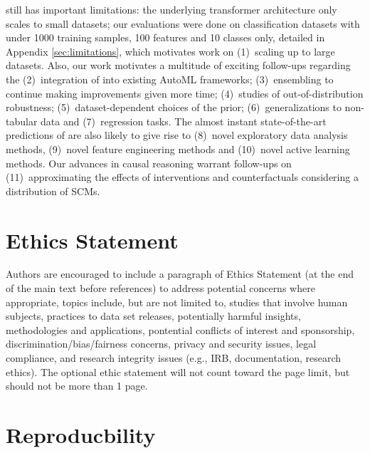 \documentclass{article}
\begin{document}
\methodname{} still has important limitations: the underlying transformer architecture only scales to small datasets; our evaluations were done on classification datasets with under 1000 training samples, 100 features and 10 classes only, detailed in Appendix \ref{sec:limitations}, which motivates work on (1)~scaling up to large datasets. Also, our work motivates a multitude of exciting follow-ups regarding the (2)~integration of \methodname{} into existing AutoML frameworks; (3)~ensembling to continue making improvements given more time; (4)~studies of out-of-distribution robustness; (5)~dataset-dependent choices of the prior; (6)~generalizations to non-tabular data and (7)~regression tasks. The almost instant state-of-the-art predictions of \methodname{} are also likely to give rise to (8)~novel exploratory data analysis methods, (9)~novel feature engineering methods and (10)~novel active learning methods. Our advances in causal reasoning warrant follow-ups on (11)~approximating the effects of interventions and counterfactuals considering a distribution of SCMs.

\iffalse
\section{Ethics Statement}

Authors are encouraged to include a paragraph of Ethics Statement (at the end of the main text before references) to address potential concerns where appropriate, topics include, but are not limited to, studies that involve human subjects, practices to data set releases, potentially harmful insights, methodologies and applications, pontential conflicts of interest and sponsorship, discrimination/bias/fairness concerns, privacy and security issues, legal compliance, and research integrity issues (e.g., IRB, documentation, research ethics). The optional ethic statement will not count toward the page limit, but should not be more than 1 page. 


\section{Reproducbility}
\end{document}
